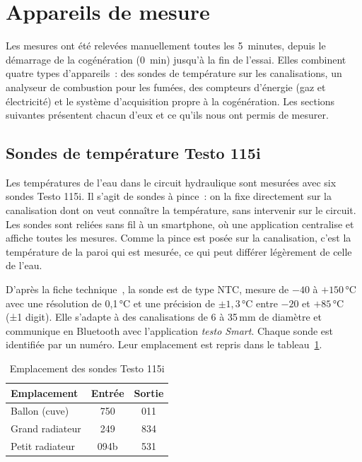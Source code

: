 \section{Appareils de mesure}
\label{sec:appareils}

Les mesures ont été relevées manuellement toutes les 5~minutes, depuis le démarrage de la cogénération (0~min) jusqu'à la fin de l'essai. Elles combinent quatre types d'appareils~: des sondes de température sur les canalisations, un analyseur de combustion pour les fumées, des compteurs d'énergie (gaz et électricité) et le système d'acquisition propre à la cogénération. Les sections suivantes présentent chacun d'eux et ce qu'ils nous ont permis de mesurer.

\subsection{Sondes de température Testo 115i}
\label{subsec:testo-115i}

Les températures de l'eau dans le circuit hydraulique sont mesurées avec six sondes Testo 115i. Il s'agit de sondes à pince~: on la fixe directement sur la canalisation dont on veut connaître la température, sans intervenir sur le circuit. Les sondes sont reliées sans fil à un smartphone, où une application centralise et affiche toutes les mesures. Comme la pince est posée sur la canalisation, c'est la température de la paroi qui est mesurée, ce qui peut différer légèrement de celle de l'eau.

D'après la fiche technique~\cite{testo115i}, la sonde est de type NTC, mesure de $-40$ à $+150$\,°C avec une résolution de 0,1\,°C et une précision de $\pm1{,}3$\,°C entre $-20$ et $+85$\,°C (±1 digit). Elle s'adapte à des canalisations de 6 à 35\,mm de diamètre et communique en Bluetooth avec l'application \emph{testo Smart}.
Chaque sonde est identifiée par un numéro. Leur emplacement est repris dans le tableau~\ref{tab:sondes}.

\begin{table}[htbp]
  \centering
  \caption{Emplacement des sondes Testo 115i}
  \label{tab:sondes}
  \begin{tabular}{lcc}
    \hline
    Emplacement & Entrée & Sortie \\
    \hline
    Ballon (cuve) & 750 & 011 \\
    Grand radiateur & 249 & 834 \\
    Petit radiateur & 094b & 531 \\
    \hline
  \end{tabular}
\end{table}

